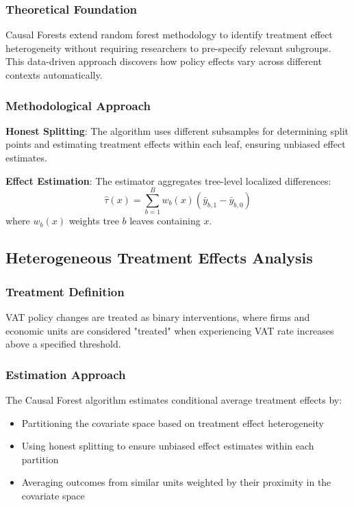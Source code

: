 \subsubsection{Theoretical Foundation}
Causal Forests extend random forest methodology to identify treatment effect heterogeneity without requiring researchers to pre-specify relevant subgroups. This data-driven approach discovers how policy effects vary across different contexts automatically.

\subsubsection{Methodological Approach}
\textbf{Honest Splitting}: The algorithm uses different subsamples for determining split points and estimating treatment effects within each leaf, ensuring unbiased effect estimates.

\textbf{Effect Estimation}: The estimator aggregates tree-level localized differences:
\begin{equation}
  \hat{\tau}(x) = \sum_{b=1}^B w_b(x) \left( \bar{y}_{b,1} - \bar{y}_{b,0} \right)
\end{equation}
where $w_b(x)$ weights tree $b$ leaves containing $x$.

\subsection{Heterogeneous Treatment Effects Analysis}\label{subsec:heterogeneous}

\subsubsection{Treatment Definition}
VAT policy changes are treated as binary interventions, where firms and economic units are considered "treated" when experiencing VAT rate increases above a specified threshold.

\subsubsection{Estimation Approach}
The Causal Forest algorithm estimates conditional average treatment effects by:
\begin{itemize}
    \item Partitioning the covariate space based on treatment effect heterogeneity
    \item Using honest splitting to ensure unbiased effect estimates within each partition
    \item Averaging outcomes from similar units weighted by their proximity in the covariate space
\end{itemize}

